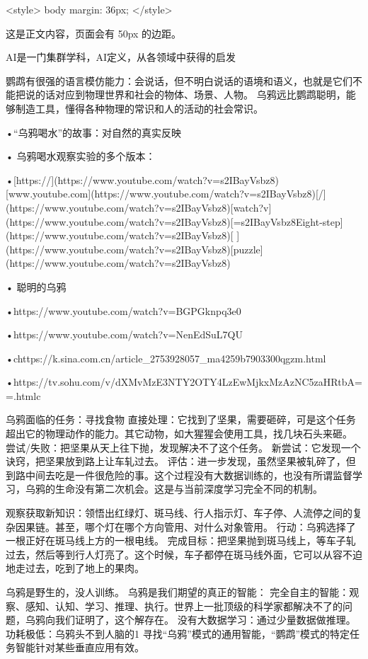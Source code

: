 <style>
  body {
    margin: 36px;
  }
</style>

这是正文内容，页面会有 50px 的边距。

AI是一门集群学科，AI定义，从各领域中获得的启发

鹦鹉有很强的语言模仿能力：会说话，但不明白说话的语境和语义，也就是它们不能把说的话对应到物理世界和社会的物体、场景、人物。
乌鸦远比鹦鹉聪明，能够制造工具，懂得各种物理的常识和人的活动的社会常识。



•“乌鸦喝水”的故事：对自然的真实反映

• 乌鸦喝水观察实验的多个版本：

•[https://](https://www.youtube.com/watch?v=s2IBayVsbz8)[www.youtube.com](https://www.youtube.com/watch?v=s2IBayVsbz8)[/](https://www.youtube.com/watch?v=s2IBayVsbz8)[watch?v](https://www.youtube.com/watch?v=s2IBayVsbz8)[=s2IBayVsbz8Eight-step](https://www.youtube.com/watch?v=s2IBayVsbz8)[ ](https://www.youtube.com/watch?v=s2IBayVsbz8)[puzzle](https://www.youtube.com/watch?v=s2IBayVsbz8)

• 聪明的乌鸦

•https://www.youtube.com/watch?v=BGPGknpq3e0

•https://www.youtube.com/watch?v=NenEdSuL7QU

•chttps://k.sina.com.cn/article_2753928057_ma4259b7903300qgzm.html

•https://tv.sohu.com/v/dXMvMzE3NTY2OTY4LzEwMjkxMzAzNC5zaHRtbA==.htmlc



乌鸦面临的任务：寻找食物
直接处理：它找到了坚果，需要砸碎，可是这个任务超出它的物理动作的能力。其它动物，如大猩猩会使用工具，找几块石头来砸。
尝试/失败：把坚果从天上往下抛，发现解决不了这个任务。
新尝试：它发现一个诀窍，把坚果放到路上让车轧过去。
评估：进一步发现，虽然坚果被轧碎了，但到路中间去吃是一件很危险的事。这个过程没有大数据训练的，也没有所谓监督学习，乌鸦的生命没有第二次机会。这是与当前深度学习完全不同的机制。



观察获取新知识：领悟出红绿灯、斑马线、行人指示灯、车子停、人流停之间的复杂因果链。甚至，哪个灯在哪个方向管用、对什么对象管用。
行动：乌鸦选择了一根正好在斑马线上方的一根电线。
完成目标：把坚果抛到斑马线上，等车子轧过去，然后等到行人灯亮了。这个时候，车子都停在斑马线外面，它可以从容不迫地走过去，吃到了地上的果肉。



乌鸦是野生的，没人训练。
乌鸦是我们期望的真正的智能：
完全自主的智能：观察、感知、认知、学习、推理、执行。世界上一批顶级的科学家都解决不了的问题，乌鸦向我们证明了，这个解存在。
没有大数据学习：通过少量数据做推理。
功耗极低：乌鸦头不到人脑的1%
寻找“乌鸦”模式的通用智能，“鹦鹉”模式的特定任务智能针对某些垂直应用有效。



